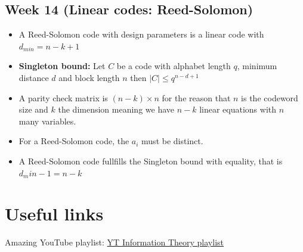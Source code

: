 \documentclass[titlepage]{article}
\begin{document}
\subsection{Week 14 (Linear codes: Reed-Solomon)}
\begin{itemize}
    \item A Reed-Solomon code with design parameters is a linear code with $d_{min} = n - k + 1$
    \item \textbf{Singleton bound:} Let $C$ be a code with alphabet length $q$, minimum distance $d$ and block length $n$ then $|C| \leq q^{n-d+1}$
    \item A parity check matrix is $(n-k) \times n$ for the reason that $n$ is the codeword size and $k$ the dimension meaning we have $n-k$ linear equations with $n$ many variables.
    \item For a Reed-Solomon code, the $a_{i}$ must be distinct. 
    \item A Reed-Solomon code fullfills the Singleton bound with equality, that is $d_min - 1 = n -k$
\end{itemize}



\section{Useful links}
Amazing YouTube playlist: \hyperlink{ https://www.youtube.com/playlist?list=PLE125425EC837021F}{YT Information Theory playlist}
\end{document}
